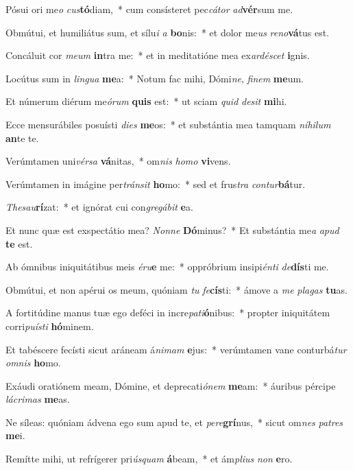 \item Pósui ori me\textit{o} \textit{cus}\textbf{tó}diam,~* cum consísteret pec\textit{cá}\textit{tor} \textit{ad}\textbf{vér}sum me.
\item Obmútui, et humiliátus sum, et sílu\textit{i} \textit{a} \textbf{bo}nis:~* et dolor me\textit{us} \textit{re}\textit{no}\textbf{vá}tus est.
\item Concáluit cor \textit{me}\textit{um} \textbf{in}tra me:~* et in meditatióne mea ex\textit{ar}\textit{dé}\textit{scet} \textbf{i}gnis.
\item Locútus sum in \textit{lin}\textit{gua} \textbf{me}a:~* Notum fac mihi, Dómi\textit{ne}, \textit{fi}\textit{nem} \textbf{me}um.
\item Et númerum diérum me\textit{ó}\textit{rum} \textbf{quis} est:~* ut sciam \textit{quid} \textit{de}\textit{sit} \textbf{mi}hi.
\item Ecce mensurábiles posuísti \textit{di}\textit{es} \textbf{me}os:~* et substántia mea tamquam \textit{ní}\textit{hi}\textit{lum} \textbf{an}te te.
\item Verúmtamen uni\textit{vér}\textit{sa} \textbf{vá}nitas,~* om\textit{nis} \textit{ho}\textit{mo} \textbf{vi}vens.
\item Verúmtamen in imágine per\textit{tráns}\textit{it} \textbf{ho}mo:~* sed et frus\textit{tra} \textit{con}\textit{tur}\textbf{bá}tur.
\item \textit{The}\textit{sau}\textbf{rí}zat:~* et ignórat cui con\textit{gre}\textit{gá}\textit{bit} \textbf{e}a.
\item Et nunc quæ est exspectátio mea? \textit{Non}\textit{ne} \textbf{Dó}minus?~* Et substántia me\textit{a} \textit{a}\textit{pud} \textbf{te} est.
\item Ab ómnibus iniquitátibus meis \textit{é}\textit{ru}\textbf{e} me:~* oppróbrium insipi\textit{én}\textit{ti} \textit{de}\textbf{dís}ti me.
\item Obmútui, et non apérui os meum, quóniam \textit{tu} \textit{fe}\textbf{cís}ti:~* ámove a \textit{me} \textit{pla}\textit{gas} \textbf{tu}as.
\item A fortitúdine manus tuæ ego deféci in incre\textit{pa}\textit{ti}\textbf{ó}nibus:~* propter iniquitátem corri\textit{pu}\textit{ís}\textit{ti} \textbf{hó}minem.
\item Et tabéscere fecísti sicut aráneam á\textit{ni}\textit{mam} \textbf{e}jus:~* verúmtamen vane conturbá\textit{tur} \textit{om}\textit{nis} \textbf{ho}mo.
\item Exáudi oratiónem meam, Dómine, et deprecati\textit{ó}\textit{nem} \textbf{me}am:~* áuribus pércipe \textit{lá}\textit{cri}\textit{mas} \textbf{me}as.
\item Ne síleas: quóniam ádvena ego sum apud te, et \textit{per}\textit{e}\textbf{grí}nus,~* sicut om\textit{nes} \textit{pa}\textit{tres} \textbf{me}i.
\item Remítte mihi, ut refrígerer pri\textit{ús}\textit{quam} \textbf{á}beam,~* et ám\textit{pli}\textit{us} \textit{non} \textbf{e}ro.
